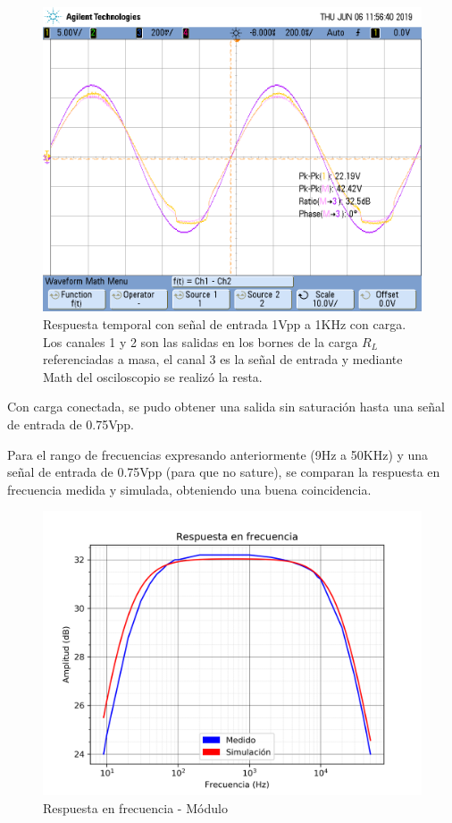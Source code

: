 \begin{figure}[!ht]
\begin{centering}
\includegraphics[scale=0.4]{Imagenes/sat_1k.png}
\par\end{centering}
\caption{Respuesta temporal con señal de entrada 1Vpp a 1KHz con carga. Los canales 1 y 2 son las salidas en los bornes de la carga $R_L$ referenciadas a masa, el canal 3 es la señal de entrada y mediante Math del osciloscopio se realizó la resta.}
\end{figure}

Con carga conectada, se pudo obtener una salida sin saturación hasta una señal de entrada de 0.75Vpp.\par
Para el rango de frecuencias expresando anteriormente (9Hz a 50KHz) y una señal de entrada de 0.75Vpp (para que no sature), se comparan la respuesta en frecuencia medida y simulada, obteniendo una buena coincidencia.

\begin{figure}[!ht]
\begin{centering}
\includegraphics[scale=0.6]{Imagenes/BodeContraste.png}
\par\end{centering}
\caption{Respuesta en frecuencia - Módulo}
\end{figure}

